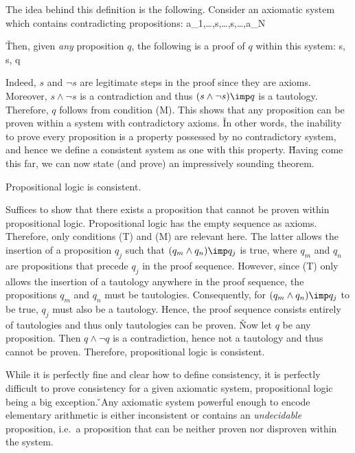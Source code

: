 The idea behind this definition is the following. Consider an axiomatic system which contains contradicting
propositions:
\bse
a_1,\ldots,s,\ldots,\neg s,\ldots,a_N
\ese

\v

Then, given \emph{any} proposition $q$, the following is a proof of $q$ within this system:
\bse
s, \neg s, q
\ese

Indeed, $s$ and $\neg s$ are legitimate steps in the proof since they are axioms. Moreover, $s\land \neg s$ is a
contradiction and thus $(s\land \neg s) \imp q$ is a tautology. Therefore, $q$ follows from condition (M). This shows
that any proposition can be proven within a system with contradictory axioms. \v

In other words, the inability to prove every proposition is a property possessed by no contradictory system, and
hence we define a consistent system as one with this property. \v

Having come this far, we can now state (and prove) an impressively sounding theorem.

\bt[]
Propositional logic is consistent.
\et

\bq
Suffices to show that there exists a proposition that cannot be proven within propositional logic. Propositional
logic has the empty sequence as axioms. Therefore, only conditions (T) and (M) are relevant here. The latter allows
the insertion of a proposition $q_j$ such that $(q_m\land q_n) \imp q_j$ is true, where $q_m$ and $q_n$ are
propositions that precede $q_j$ in the proof sequence. However, since (T) only allows the insertion of a tautology
anywhere in the proof sequence, the propositions $q_m$ and $q_n$ must be tautologies. Consequently, for $(q_m\land
q_n) \imp q_j$ to be true, $q_j$ must also be a tautology. Hence, the proof sequence consists entirely of tautologies
and thus only tautologies can be proven. \v

Now let $q$ be any proposition. Then $q\land \neg q$ is a contradiction, hence not a tautology and thus cannot be
proven. Therefore, propositional logic is consistent.
\eq

While it is perfectly fine and clear how to define consistency, it is perfectly difficult to prove consistency for a
given axiomatic system, propositional logic being a big exception. \v

\bt[]
Any axiomatic system powerful enough to encode elementary arithmetic is either inconsistent or contains an
\emph{undecidable} proposition, i.e.\ a proposition that can be neither proven nor disproven
within the system.
\et

